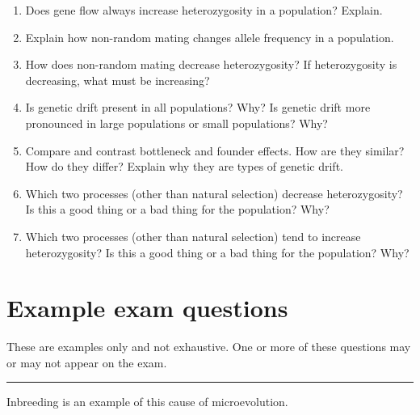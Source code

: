 \documentclass[letterpaper]{tufte-handout}
\begin{document}
\begin{enumerate}
	\item Does gene flow always increase heterozygosity in a population? Explain.
	
	\item Explain%
	how non-random mating changes allele frequency in a population.
	 
	\item How does non-random mating decrease heterozygosity?%
	If heterozygosity is decreasing, what must be increasing?
	
	\item Is genetic drift present in all populations?%
	 Why? Is genetic drift more pronounced in large populations or 
	 small populations?  Why?

	\item Compare and contrast bottleneck and founder effects.%
	How are they similar?  How do they differ?  Explain why they are types of genetic drift.
		
	\item Which two processes (other than natural selection) decrease 
	heterozygosity? Is this a good thing or a bad thing for the 
	population? Why?
	
	\item Which two processes (other than natural selection) tend 
	to increase heterozygosity? Is this a good thing or a bad thing 
	for the population? Why?

\end{enumerate}

\section*{Example exam questions}

These are examples only and not exhaustive. One or more of these questions may or may not appear on the exam.

\bigskip

\noindent \rule{1in}{0.4pt} Inbreeding is an example of this cause of microevolution.
\end{document}
